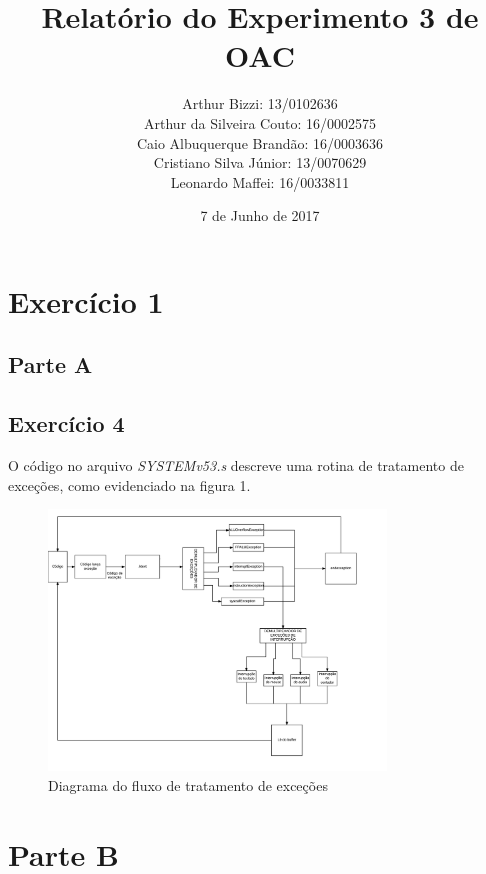 \documentclass[12pt, a4paper, twoside]{article}
\begin{document}
\title{Relatório do Experimento 3 de OAC}
\author{
Arthur Bizzi: 13/0102636 \\
Arthur da Silveira Couto: 16/0002575 \\
Caio Albuquerque Brandão: 16/0003636 \\
Cristiano Silva Júnior: 13/0070629 \\
Leonardo Maffei: 16/0033811 \\}
\date{7 de Junho de 2017}
\maketitle

\section{Exercício 1}

\subsection{Parte A}

\subsection{Exercício 4}

O código no arquivo \textit{SYSTEMv53.s} descreve uma rotina de tratamento de exceções, como evidenciado na figura 1.

\begin{figure}
    \centering
    \includegraphics[width=0.8\textwidth]{./figs/f1-4.png}
    \caption{Diagrama do fluxo de tratamento de exceções}
\end{figure}

\section{Parte B}
\end{document}
